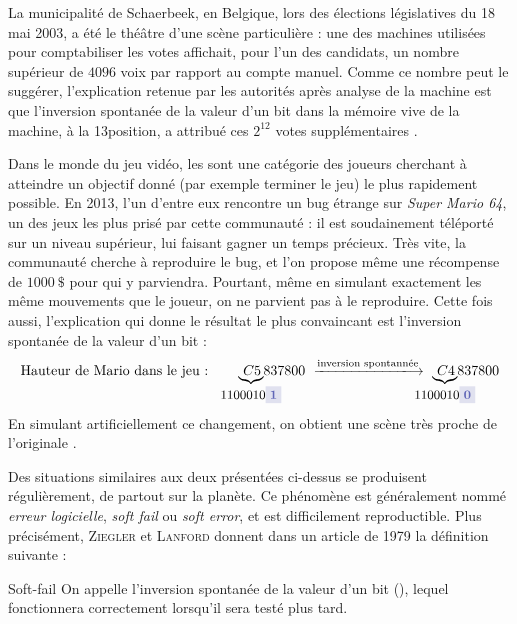 \documentclass[a4paper,french,bookmarks]{article}
\begin{document}
    La municipalité de Schaerbeek, en Belgique, lors des élections législatives du 18 mai 2003, a été le théâtre d'une scène particulière : une des machines utilisées pour comptabiliser les votes affichait, pour l'un des candidats, un nombre supérieur de $4096$ voix par rapport au compte manuel. Comme ce nombre peut le suggérer, l'explication retenue par les autorités après analyse de la machine est que l'inversion spontanée de la valeur d'un bit dans la mémoire vive de la machine, à la 13\ieme position, a attribué ces $2^{12}$ votes supplémentaires \cite{nappa2021dejavu}. 

    Dans le monde du jeu vidéo, les  sont une catégorie des joueurs cherchant à atteindre un objectif donné (par exemple terminer le jeu) le plus rapidement possible. En 2013, l'un d'entre eux rencontre un bug étrange sur \emph{Super Mario 64}, un des jeux les plus prisé par cette communauté : il est soudainement téléporté sur un niveau supérieur, lui faisant gagner un temps précieux. Très vite, la communauté cherche à reproduire le bug, et l'on propose même une récompense de $1000~\$$ pour qui y parviendra. Pourtant, même en simulant exactement les même mouvements que le joueur, on ne parvient pas à le reproduire. Cette fois aussi, l'explication qui donne le résultat le plus convaincant est l'inversion spontanée de la valeur d'un bit :
    \[ \text{Hauteur de Mario dans le jeu :}\qquad \underbrace{C5\!}_{\makebox[0pt]{\small 1100010\colorbox{main3!85!gray!20}{\color{main3}\bfseries 1}}}\!837800 \ \xlongrightarrow{\text{inversion spontannée}} \ \underbrace{C4\!}_{\makebox[0pt]{\small 1100010\colorbox{main3!85!gray!20}{\color{main3}\bfseries 0}}}\!837800 \]
    En simulant artificiellement ce changement, on obtient une scène très proche de l'originale \cite{burtt20}. 

    Des situations similaires aux deux présentées ci-dessus se produisent régulièrement, de partout sur la planète. Ce phénomène est généralement nommé \emph{erreur logicielle}, \emph{soft fail} ou \emph{soft error}, et est difficilement reproductible. Plus précisément, \textsc{Ziegler} et \textsc{Lanford} donnent dans un article de 1979 \cite{ziegler79} la définition suivante :
    
    \begin{definition}{Soft-fail}{}
        On appelle  l'inversion spontanée de la valeur d'un bit (), lequel fonctionnera correctement lorsqu'il sera testé plus tard.
    \end{definition}
    
\end{document}
